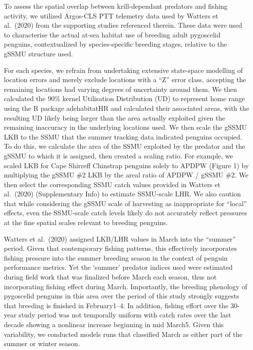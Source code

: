 \documentclass[]{elsarticle} %
\begin{document}
To assess the spatial overlap between krill-dependant predators and
fishing activity, we utilized Argos-CLS PTT telemetry data used by
Watters et al.~(2020) from the supporting studies referenced therein.
These data were used to characterise the actual at-sea habitat use of
breeding adult pygoscelid penguins, contextualized by species-specific
breeding stages, relative to the gSSMU structure used.

For each species, we refrain from undertaking extensive state-space
modelling of location errors and merely exclude locations with a ``Z''
error class, accepting the remaining locations had varying degrees of
uncertainty around them. We then calculated the 90\% kernel Utilisation
Distribution (UD) to represent home range using the R package
adehabitatHR and calculated their associated areas, with the resulting
UD likely being larger than the area actually exploited given the
remaining inaccuracy in the underlying locations used. We then scale the
gSSMU LKB to the SSMU that the summer tracking data indicated penguins
occupied. To do this, we calculate the area of the SSMU exploited by the
predator and the gSSMU to which it is assigned, then created a scaling
ratio. For example, we scaled LKB for Cape Shirreff Chinstrap penguins
solely to APDPW (Figure 1) by multiplying the gSSMU \#2 LKB by the areal
ratio of APDPW / gSSMU \#2. We then select the corresponding SSMU catch
values provided in Watters et al.~(2020) (Supplementary Info) to
estimate SSMU-scale LHR. We also caution that while considering the
gSSMU scale of harvesting as inappropriate for ``local'' effects, even
the SSMU-scale catch levels likely do not accurately reflect pressures
at the fine spatial scales relevant to breeding penguins.

Watters et al.~(2020) assigned LKB/LHR values in March into the
``summer'' period. Given that contemporary fishing patterns, this
effectively incorporates fishing pressure into the summer breeding
season in the context of penguin performance metrics. Yet the `summer'
predator indices used were estimated during field work that was
finalized before March each season, thus not incorporating fishing
effect during March. Importantly, the breeding phenology of pygoscelid
penguins in this area over the period of this study strongly suggests
that breeding is finished in February1--4. In addition, fishing effort
over the 30-year study period was not temporally uniform with catch
rates over the last decade showing a nonlinear increase beginning in mid
March5. Given this variability, we conducted models runs that classified
March as either part of the summer or winter season.
\end{document}
